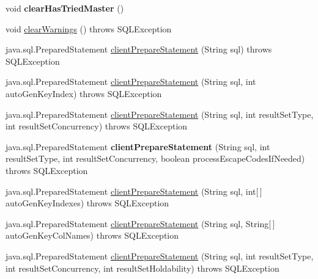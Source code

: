 \begin{DoxyCompactItemize}
\item 
\mbox{\label{classcom_1_1mysql_1_1cj_1_1jdbc_1_1_connection_impl_ac4217c85e8137986c58604454de14cfd}} 
void {\bfseries clear\+Has\+Tried\+Master} ()
\item 
void \mbox{\hyperlink{classcom_1_1mysql_1_1cj_1_1jdbc_1_1_connection_impl_a5f8f37e6f8b36663bae849559cc89afa}{clear\+Warnings}} ()  throws S\+Q\+L\+Exception 
\item 
java.\+sql.\+Prepared\+Statement \mbox{\hyperlink{classcom_1_1mysql_1_1cj_1_1jdbc_1_1_connection_impl_a97fe5e29bb844493eb31b4f1c48d8bc7}{client\+Prepare\+Statement}} (String sql)  throws S\+Q\+L\+Exception 
\item 
java.\+sql.\+Prepared\+Statement \mbox{\hyperlink{classcom_1_1mysql_1_1cj_1_1jdbc_1_1_connection_impl_ac15baa66a2fe559cb558a0afd9c7cc03}{client\+Prepare\+Statement}} (String sql, int auto\+Gen\+Key\+Index)  throws S\+Q\+L\+Exception 
\item 
java.\+sql.\+Prepared\+Statement \mbox{\hyperlink{classcom_1_1mysql_1_1cj_1_1jdbc_1_1_connection_impl_a08e44e57c6c4a70f6d4ea9a71b612b0e}{client\+Prepare\+Statement}} (String sql, int result\+Set\+Type, int result\+Set\+Concurrency)  throws S\+Q\+L\+Exception 
\item 
\mbox{\label{classcom_1_1mysql_1_1cj_1_1jdbc_1_1_connection_impl_a18396b29f2d238be089029b1db546a00}} 
java.\+sql.\+Prepared\+Statement {\bfseries client\+Prepare\+Statement} (String sql, int result\+Set\+Type, int result\+Set\+Concurrency, boolean process\+Escape\+Codes\+If\+Needed)  throws S\+Q\+L\+Exception 
\item 
java.\+sql.\+Prepared\+Statement \mbox{\hyperlink{classcom_1_1mysql_1_1cj_1_1jdbc_1_1_connection_impl_aec5834ec5d7244d13cefd58333b3c553}{client\+Prepare\+Statement}} (String sql, int\mbox{[}$\,$\mbox{]} auto\+Gen\+Key\+Indexes)  throws S\+Q\+L\+Exception 
\item 
java.\+sql.\+Prepared\+Statement \mbox{\hyperlink{classcom_1_1mysql_1_1cj_1_1jdbc_1_1_connection_impl_ade3184b1d304b0ab3a5a0f5d2f8f0539}{client\+Prepare\+Statement}} (String sql, String\mbox{[}$\,$\mbox{]} auto\+Gen\+Key\+Col\+Names)  throws S\+Q\+L\+Exception 
\item 
java.\+sql.\+Prepared\+Statement \mbox{\hyperlink{classcom_1_1mysql_1_1cj_1_1jdbc_1_1_connection_impl_ade6127c1a3fdabd2af201e60498afad4}{client\+Prepare\+Statement}} (String sql, int result\+Set\+Type, int result\+Set\+Concurrency, int result\+Set\+Holdability)  throws S\+Q\+L\+Exception 

\end{DoxyCompactItemize}
